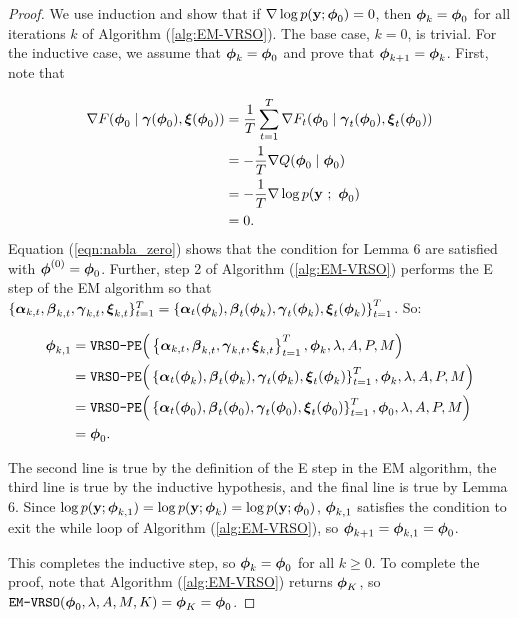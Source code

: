 \begin{proof}

We use induction and show that if $\nabla \log p(\mathbf{y};\boldsymbol{\phi}_0) = 0$, then $\boldsymbol{\phi}_{k} = \boldsymbol{\phi}_0$ for all iterations $k$ of Algorithm (\ref{alg:EM-VRSO}). The base case, $k = 0$, is trivial. For the inductive case, we assume that $\boldsymbol{\phi}_k = \boldsymbol{\phi}_0$ and prove that $\boldsymbol{\phi}_{k+1} = \boldsymbol{\phi}_k$. First, note that 

\begin{align}
    \nabla F(\boldsymbol{\phi}_{0} \mid \boldsymbol{\gamma}(\boldsymbol{\phi}_{0}), \boldsymbol{\xi}(\boldsymbol{\phi}_{0})) &= \frac{1}{T} \sum_{t=1}^T \nabla F_t(\boldsymbol{\phi}_0 \mid \boldsymbol{\gamma}_t(\boldsymbol{\phi}_0), \boldsymbol{\xi}_t(\boldsymbol{\phi}_0)) \nonumber \\
    &= -\frac{1}{T} \nabla Q(\boldsymbol{\phi}_0 \mid \boldsymbol{\phi}_0) \nonumber \\
    &= -\frac{1}{T} \nabla \log p(\mathbf{y} ~;~ \boldsymbol{\phi}_0) \nonumber \\
    &= 0 \label{eqn:nabla_zero}.
\end{align}
%
Equation (\ref{eqn:nabla_zero}) shows that the condition for Lemma 6 are satisfied with $\boldsymbol{\phi}^{(0)} = \boldsymbol{\phi}_0$. Further, step 2 of Algorithm (\ref{alg:EM-VRSO}) performs the E step of the EM algorithm so that $\{\boldsymbol{\alpha}_{k,t}, \boldsymbol{\beta}_{k,t}, \boldsymbol{\gamma}_{k,t}, \boldsymbol{\xi}_{k,t}\}_{t=1}^T = \left\{\boldsymbol{\alpha}_t(\boldsymbol{\phi}_k), \boldsymbol{\beta}_t(\boldsymbol{\phi}_k), \boldsymbol{\gamma}_t(\boldsymbol{\phi}_k), \boldsymbol{\xi}_t(\boldsymbol{\phi}_k) \right\}_{t=1}^T$. So:

\begin{align*}
    \boldsymbol{\phi}_{k,1} &= \texttt{VRSO-PE}\Big(\left\{\boldsymbol{\alpha}_{k,t}, \boldsymbol{\beta}_{k,t}, \boldsymbol{\gamma}_{k,t}, \boldsymbol{\xi}_{k,t}\right\}_{t=1}^T, \boldsymbol{\phi}_k, \lambda, A, P, M \Big) \\
    &= \texttt{VRSO-PE}\Big(\left\{\boldsymbol{\alpha}_t(\boldsymbol{\phi}_k),\boldsymbol{\beta}_t(\boldsymbol{\phi}_k),\boldsymbol{\gamma}_t(\boldsymbol{\phi}_k),\boldsymbol{\xi}_t(\boldsymbol{\phi}_k)\right\}_{t=1}^T, \boldsymbol{\phi}_k, \lambda, A, P, M \Big)\\
    &= \texttt{VRSO-PE}\Big(\left\{\boldsymbol{\alpha}_t(\boldsymbol{\phi}_0),\boldsymbol{\beta}_t(\boldsymbol{\phi}_0),\boldsymbol{\gamma}_t(\boldsymbol{\phi}_0),\boldsymbol{\xi}_t(\boldsymbol{\phi}_0)\right\}_{t=1}^T, \boldsymbol{\phi}_0, \lambda, A, P, M \Big)\\
    &= \boldsymbol{\phi}_0.
\end{align*}

The second line is true by the definition of the E step in the EM algorithm, the third line is true by the inductive hypothesis, and the final line is true by Lemma 6. Since $\log p(\mathbf{y}; \boldsymbol{\phi}_{k,1}) = \log p(\mathbf{y};\boldsymbol{\phi}_{k}) = \log p(\mathbf{y}; \boldsymbol{\phi}_{0})$, $\boldsymbol{\phi}_{k,1}$ satisfies the condition to exit the while loop of Algorithm (\ref{alg:EM-VRSO}), so $\boldsymbol{\phi}_{k+1} = \boldsymbol{\phi}_{k,1} = \boldsymbol{\phi}_{0}$. 

This completes the inductive step, so $\boldsymbol{\phi}_k = \boldsymbol{\phi}_0$ for all $k \geq 0$. To complete the proof, note that Algorithm (\ref{alg:EM-VRSO}) returns $\boldsymbol{\phi}_K$, so $\texttt{EM-VRSO}(\boldsymbol{\phi}_0, \lambda, A, M, K) = \boldsymbol{\phi}_K = \boldsymbol{\phi}_0$.
\end{proof}